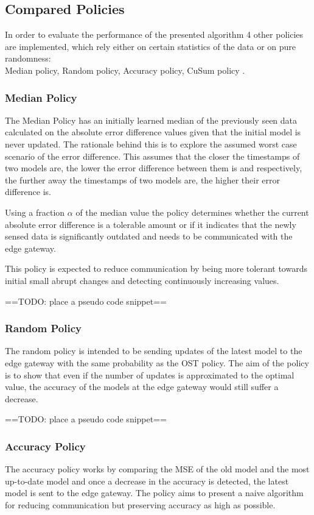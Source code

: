 \documentclass{mpaper}
\begin{document}
\subsection{Compared Policies}

In order to evaluate the performance of the presented algorithm 4 other policies are implemented, which rely either on certain statistics of the data or on pure randomness:\\
Median policy, Random policy, Accuracy policy, CuSum policy \cite{cusum_pierre}.

\subsubsection{Median Policy}

The Median Policy has an initially learned median of the previously seen data calculated on the absolute error difference values given that the initial model is never updated. 
The rationale behind this is to explore the assumed worst case scenario of the error difference. This assumes that the closer the timestamps of two models are, the lower the error difference between them is and respectively, the further away the timestamps of two models are, the higher their error difference is.

Using a fraction $\alpha$ of the median value the policy determines whether the current absolute error difference is a tolerable amount or if it indicates that the newly sensed data is significantly outdated and needs to be communicated with the edge gateway.

This policy is expected to reduce communication by being more tolerant towards initial small abrupt changes and detecting continuously increasing values.

==TODO: place a pseudo code snippet==

\subsubsection{Random Policy}
The random policy is intended to be sending updates of the latest model to the edge gateway with the same probability as the OST policy.
The aim of the policy is to show that even if the number of updates is approximated to the optimal value, the accuracy of the models at the edge gateway would still suffer a decrease.

==TODO: place a pseudo code snippet==

\subsubsection{Accuracy Policy}
The accuracy policy works by comparing the MSE of the old model and the most up-to-date model and once a decrease in the accuracy is detected, the latest model is sent to the edge gateway.
The policy aims to present a naive algorithm for reducing communication but preserving accuracy as high as possible.
\end{document}

